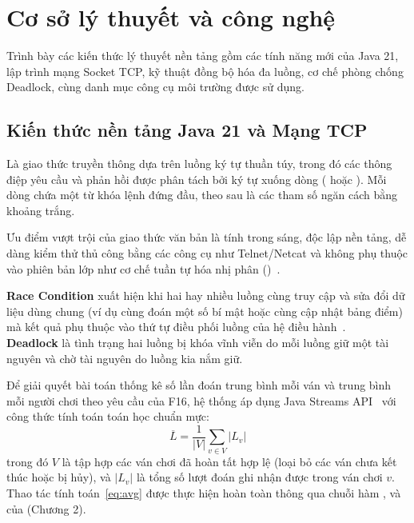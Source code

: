 \chapter{Cơ sở lý thuyết và công nghệ}
\label{ch:coso}

\begin{muctieu}
Trình bày các kiến thức lý thuyết nền tảng gồm các tính năng mới của Java 21,
lập trình mạng Socket TCP, kỹ thuật đồng bộ hóa đa luồng, cơ chế phòng chống
Deadlock, cùng danh mục công cụ môi trường được sử dụng.
\end{muctieu}

\section{Kiến thức nền tảng Java 21 và Mạng TCP}

\begin{dinhnghia}
Là giao thức truyền thông dựa trên luồng ký tự thuần túy, trong đó các thông
điệp yêu cầu và phản hồi được phân tách bởi ký tự xuống dòng
( hoặc ). Mỗi
dòng chứa một từ khóa lệnh đứng đầu, theo sau là các tham số ngăn cách bằng
khoảng trắng.
\end{dinhnghia}

Ưu điểm vượt trội của giao thức văn bản là tính trong sáng, độc lập nền tảng,
dễ dàng kiểm thử thủ công bằng các công cụ như Telnet/Netcat và không phụ
thuộc vào phiên bản lớp như cơ chế tuần tự hóa nhị phân
()~\cite{bloch2018effective}.

\begin{dinhnghia}
\textbf{Race Condition} xuất hiện khi hai hay nhiều luồng cùng truy cập và sửa
đổi dữ liệu dùng chung (ví dụ cùng đoán một số bí mật hoặc cùng cập nhật bảng
điểm) mà kết quả phụ thuộc vào thứ tự điều phối luồng của hệ điều
hành~\cite{goetz2006java}.\\
\textbf{Deadlock} là tình trạng hai luồng bị khóa vĩnh viễn do mỗi luồng giữ
một tài nguyên và chờ tài nguyên do luồng kia nắm giữ.
\end{dinhnghia}

Để giải quyết bài toán thống kê số lần đoán trung bình mỗi ván và trung bình
mỗi người chơi theo yêu cầu của F16, hệ thống áp dụng Java Streams
API~\cite{oraclejava21} với công thức tính toán toán học chuẩn mực:
\begin{equation}
\overline{L} = \frac{1}{|V|} \sum_{v \in V} |L_v|
\label{eq:avg}
\end{equation}
trong đó $V$ là tập hợp các ván chơi đã hoàn tất hợp lệ (loại bỏ các ván chưa
kết thúc hoặc bị hủy), và $|L_v|$ là tổng số lượt đoán ghi nhận được trong ván
chơi $v$. Thao tác tính toán~\eqref{eq:avg} được thực hiện hoàn toàn thông qua
chuỗi hàm ,  và  của
 (Chương 2).

